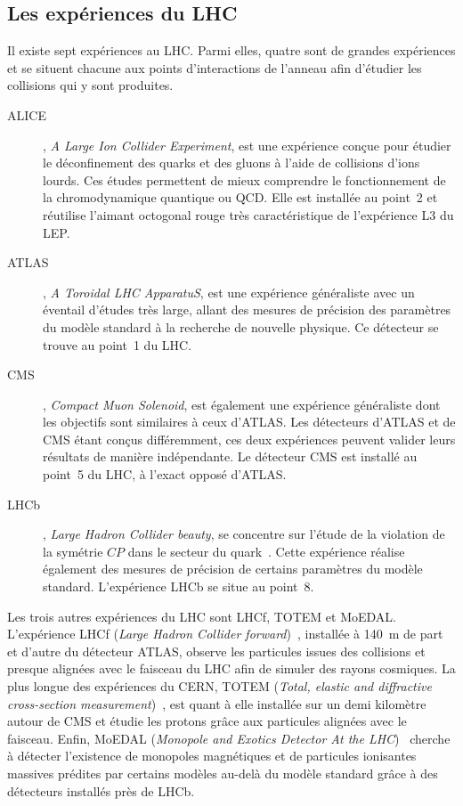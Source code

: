\subsection{Les expériences du LHC}\label{chapter-LHC-section-LHC-subsec-experiments}
Il existe sept expériences au LHC.
Parmi elles, quatre sont de \og grandes expériences \fg{} et se situent chacune aux points d'interactions de l'anneau afin d'étudier les collisions qui y sont produites.
\begin{description}
\item[ALICE]\cite{alice_paper}, \emph{A Large Ion Collider Experiment}, est une expérience conçue pour étudier le déconfinement des quarks et des gluons à l'aide de collisions d'ions lourds. Ces études permettent de mieux comprendre le fonctionnement de la chromodynamique quantique ou QCD. Elle est installée au point~2 et réutilise l'aimant octogonal rouge très caractéristique de l'expérience L3 du LEP.
\item[ATLAS]\cite{atlas_paper}, \emph{A Toroidal LHC ApparatuS}, est une expérience généraliste avec un éventail d'études très large, allant des mesures de précision des paramètres du modèle standard à la recherche de nouvelle physique. Ce détecteur se trouve au point~1 du LHC.
\item[CMS]\cite{cms_paper}, \emph{Compact Muon Solenoid}, est également une expérience généraliste dont les objectifs sont similaires à ceux d'ATLAS. Les détecteurs d'ATLAS et de CMS étant conçus différemment, ces deux expériences peuvent valider leurs résultats de manière indépendante. Le détecteur CMS est installé au point~5 du LHC, à l'exact opposé d'ATLAS.
\item[LHCb]\cite{lhcb_paper}, \emph{Large Hadron Collider beauty}, se concentre sur l'étude de la violation de la symétrie $CP$ dans le secteur du quark~\quarkb. Cette expérience réalise également des mesures de précision de certains paramètres du modèle standard. L'expérience LHCb se situe au point~8.
\end{description}
\par Les trois autres expériences du LHC sont LHCf, TOTEM et MoEDAL.
L'expérience LHCf (\emph{Large Hadron Collider forward})~\cite{lhcf_paper}, installée à \SI{140}{\meter} de part et d'autre du détecteur ATLAS, observe les particules issues des collisions et presque alignées avec le faisceau du LHC afin de simuler des rayons cosmiques.
La plus \og longue \fg{} des expériences du CERN, TOTEM (\emph{Total, elastic and diffractive cross-section measurement})~\cite{totem_paper}, est quant à elle installée sur un demi kilomètre autour de CMS et étudie les protons grâce aux particules alignées avec le faisceau.
Enfin, MoEDAL (\emph{Monopole and Exotics Detector At the LHC})~\cite{moedal_paper} cherche à détecter l'existence de monopoles magnétiques et de particules ionisantes massives prédites par certains modèles au-delà du modèle standard grâce à des détecteurs installés près de LHCb.